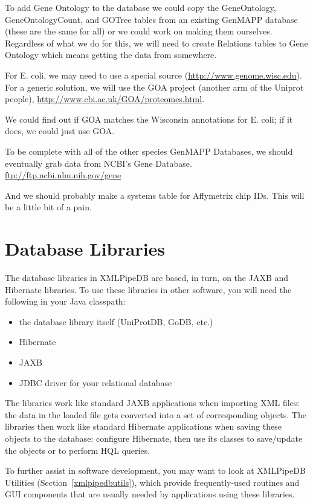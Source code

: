 \documentclass[11pt]{article}
\begin{document}
\begin{enumerate}
{To add Gene Ontology to the database we could copy the GeneOntology, GeneOntologyCount, and GOTree tables from an existing GenMAPP database (these are the same for all) or we could work on making them ourselves.  Regardless of what we do for this, we will need to create Relations tables to Gene Ontology which means getting the data from somewhere.

For E. coli, we may need to use a special source (\url{http://www.genome.wisc.edu}).  For a generic solution, we will use the GOA project (another arm of the Uniprot people), \url{http://www.ebi.ac.uk/GOA/proteomes.html}.

We could find out if GOA matches the Wisconsin annotations for E. coli; if it does, we could just use GOA.

To be complete with all of the other species GenMAPP Databases, we should eventually grab data from NCBI's Gene Database.  \url{ftp://ftp.ncbi.nlm.nih.gov/gene}

And we should probably make a systems table for Affymetrix chip IDs.  This will be a little bit of a pain.}
\end{enumerate}

\section{Database Libraries}
\label{dblib}

The database libraries in XMLPipeDB are based, in turn, on the JAXB and Hibernate libraries.  To use these libraries in other software, you will need the following in your Java classpath:
\begin{itemize}
\item the database library itself (UniProtDB, GoDB, etc.)
\item Hibernate
\item JAXB
\item JDBC driver for your relational database
\end{itemize}
The libraries work like standard JAXB applications when importing XML files: the data in the loaded file gets converted into a set of corresponding objects.  The libraries then work like standard Hibernate applications when saving these objects to the database: configure Hibernate, then use its classes to save/update the objects or to perform HQL queries.

To further assist in software development, you may want to look at XMLPipeDB Utilities (Section~\ref{xmlpipedbutils}), which provide frequently-used routines and GUI components that are usually needed by applications using these libraries.
\end{document}
